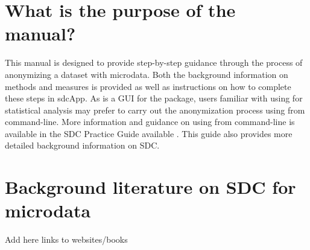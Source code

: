 \documentclass[letterpaper,10pt,english]{sphinxmanual}
\begin{document}
\section{What is the purpose of the manual?}
\label{\detokenize{introduction:what-is-the-purpose-of-the-manual}}
This manual is designed to provide step-by-step guidance through the process of anonymizing a
dataset with microdata. Both the background information on methods and measures is
provided as well as instructions on how to complete these steps in sdcApp. As  is a
GUI for the  package, users familiar with using  for statistical analysis
may prefer to carry out the anonymization process using  from command-line.
More information and guidance on using  from command-line
is available in the SDC Practice Guide available .
This guide also provides more detailed background information on SDC.


\section{Background literature on SDC for microdata}
\label{\detokenize{introduction:background-literature-on-sdc-for-microdata}}
Add here links to websites/books
\end{document}
